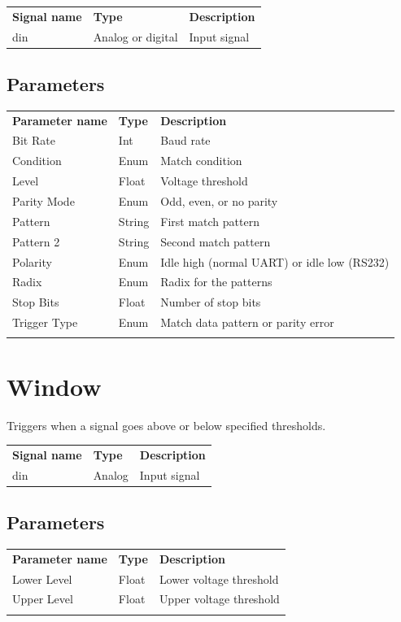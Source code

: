 \begin{tabularx}{16cm}{llX}
\thickhline
\textbf{Signal name} & \textbf{Type} & \textbf{Description} \\
\thickhline
din & Analog or digital & Input signal \\
\end{tabularx}

\subsection{Parameters}

\begin{tabularx}{16cm}{llX}
\thickhline
\textbf{Parameter name} & \textbf{Type} & \textbf{Description} \\
\thickhline
Bit Rate & Int & Baud rate \\
\thickhline
Condition & Enum & Match condition \\
\thickhline
Level & Float & Voltage threshold\\
\thickhline
Parity Mode & Enum & Odd, even, or no parity \\
\thickhline
Pattern & String & First match pattern\\
\thickhline
Pattern 2 & String & Second match pattern \\
\thickhline
Polarity & Enum & Idle high (normal UART) or idle low (RS232)\\
\thickhline
Radix & Enum & Radix for the patterns\\
\thickhline
Stop Bits & Float & Number of stop bits\\
\thickhline
Trigger Type & Enum & Match data pattern or parity error\\
\thickhline
\end{tabularx}


\section{Window}

Triggers when a signal goes above or below specified thresholds.

\begin{tabularx}{16cm}{llX}
\thickhline
\textbf{Signal name} & \textbf{Type} & \textbf{Description} \\
\thickhline
din & Analog & Input signal \\
\end{tabularx}

\subsection{Parameters}

\begin{tabularx}{16cm}{llX}
\thickhline
\textbf{Parameter name} & \textbf{Type} & \textbf{Description} \\
\thickhline
Lower Level & Float & Lower voltage threshold\\
\thickhline
Upper Level & Float & Upper voltage threshold\\
\thickhline
\end{tabularx}


